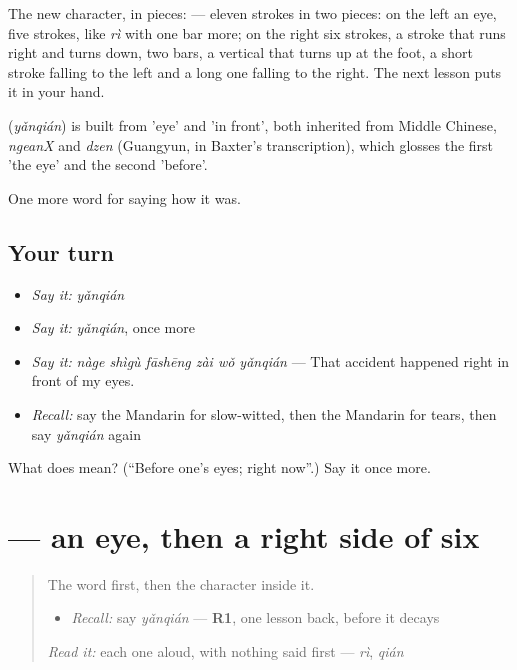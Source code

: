The new character, in pieces:  — eleven strokes in two pieces: on the left an eye, five strokes, like  \emph{rì} with one bar more; on the right six strokes, a stroke that runs right and turns down, two bars, a vertical that turns up at the foot, a short stroke falling to the left and a long one falling to the right. The next lesson puts it in your hand.

\begin{cousinweb}
\textbf{} (\emph{yǎnqián}) is built from  'eye' and  'in front', both inherited from Middle Chinese, \emph{ngeanX} and \emph{dzen} (Guangyun, in Baxter's transcription), which glosses the first 'the eye' and the second 'before'.
\end{cousinweb}

\begin{grammarlens}[title={What you've built}]
One more word for saying how it was.
\end{grammarlens}

\subsection*{Your turn}
\begin{itemize}
\raggedright
  \item \emph{Say it:} \emph{yǎnqián}
  \item \emph{Say it:} \emph{yǎnqián}, once more
  \item \emph{Say it:} \emph{nàge shìgù fāshēng zài wǒ yǎnqián} — That accident happened right in front of my eyes.
  \item \emph{Recall:} say the Mandarin for slow-witted, then the Mandarin for tears, then say \emph{yǎnqián} again
\end{itemize}

\begin{tcolorbox}[breakable,colback=teal!4,colframe=teal!35!black,title={Before you move on}]
What does  mean? (\textquotedblleft{}Before one's eyes; right now\textquotedblright{}.) Say it once more.
\end{tcolorbox}
\section[\texorpdfstring{\zh{眼} (yǎn)}{眼 (yǎn)}]{ — an eye, then a right side of six}

\label{lesson:ZH-W471-yan-eye}



\begin{quote}
The word first, then the character inside it.

\begin{itemize}
\raggedright
  \item \emph{Recall:} say \emph{yǎnqián} — \textbf{R1}, one lesson back, before it decays
\end{itemize}

\begin{quote}
 
\end{quote}

\emph{Read it:} each one aloud, with nothing said first — \emph{rì}, \emph{qián}
\end{quote}

